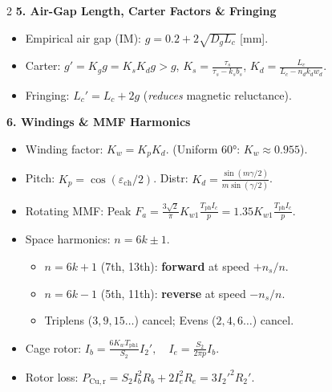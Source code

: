 \begin{multicols}{2}
\textbf{5. Air-Gap Length, Carter Factors \& Fringing}
\vspace{-0.3em}
\begin{itemize}\setlength{\itemsep}{0pt}\setlength{\parskip}{0pt}
  \item Empirical air gap (IM): $g = 0.2 + 2\sqrt{D_g L_c}$ [$\mathrm{mm}$].
  \item Carter: $g' = K_g g = K_s K_d g > g$, $K_s = \frac{\tau_s}{\tau_s - k_s b_s}$, $K_d = \frac{L_c}{L_c - n_d k_d w_d}$.
  \item Fringing: $L_c' = L_c + 2g$ (\textit{reduces} magnetic reluctance).
\end{itemize}

\textbf{6. Windings \& MMF Harmonics}
\vspace{-0.3em}
\begin{itemize}\setlength{\itemsep}{0pt}\setlength{\parskip}{0pt}
  \item Winding factor: $K_w = K_p K_d$. (Uniform 60°: $K_w \approx 0.955$).
  \item Pitch: $K_p = \cos(\varepsilon_{\mathrm{ch}}/2)$. Distr: $K_d = \frac{\sin(m\gamma/2)}{m\sin(\gamma/2)}$.
  \item Rotating MMF: Peak $F_a = \frac{3\sqrt{2}}{\pi} K_{w1} \frac{T_{\mathrm{ph}} I_c}{p} = 1.35 K_{w1}\frac{T_{\mathrm{ph}} I_c}{p}$.
  \item Space harmonics: $n = 6k \pm 1$.
    \begin{itemize}\setlength{\itemsep}{0pt}
      \item $n = 6k+1$ (7th, 13th): \textbf{forward} at speed $+n_s/n$.
      \item $n = 6k-1$ (5th, 11th): \textbf{reverse} at speed $-n_s/n$.
      \item Triplens ($3,9,15\dots$) cancel; Evens ($2,4,6\dots$) cancel.
    \end{itemize}
  \item Cage rotor: $I_b = \frac{6 K_w T_{\mathrm{ph1}}}{S_2} I_2',\quad I_e = \frac{S_2}{2\pi p} I_b$.
  \item Rotor loss: $P_{\mathrm{Cu,r}} = S_2 I_b^2 R_b + 2 I_e^2 R_e = 3 I_2'^2 R_2'$.
\end{itemize}

\columnbreak


\end{multicols}

